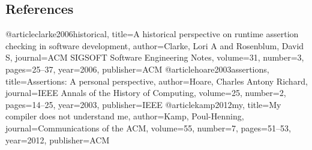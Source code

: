 \documentclass{sig-alternate}
\begin{document}
\subsection{References}
\begin{thebibliography}{9}
\bibitem @article{clarke2006historical,
  title={A historical perspective on runtime assertion checking in software development},
  author={Clarke, Lori A and Rosenblum, David S},
  journal={ACM SIGSOFT Software Engineering Notes},
  volume={31},
  number={3},
  pages={25--37},
  year={2006},
  publisher={ACM}
}
\bibitem @article{hoare2003assertions,
  title={Assertions: A personal perspective},
  author={Hoare, Charles Antony Richard},
  journal={IEEE Annals of the History of Computing},
  volume={25},
  number={2},
  pages={14--25},
  year={2003},
  publisher={IEEE}
}
\bibitem @article{kamp2012my,
  title={My compiler does not understand me},
  author={Kamp, Poul-Henning},
  journal={Communications of the ACM},
  volume={55},
  number={7},
  pages={51--53},
  year={2012},
  publisher={ACM}
}
\end{thebibliography}
\end{document}
